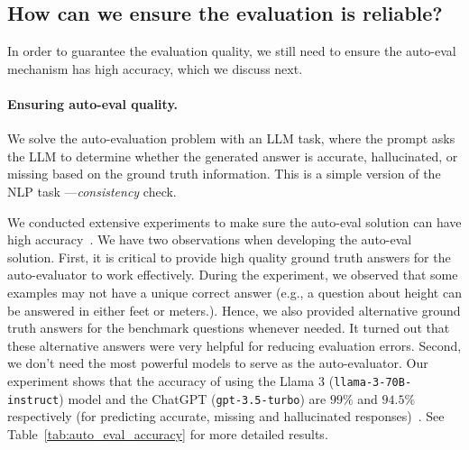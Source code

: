 \subsection{How can we ensure the evaluation is reliable?}
In order to guarantee the evaluation quality, we still need to ensure the auto-eval mechanism has high accuracy, which we discuss next.

\paragraph{Ensuring auto-eval quality.}
We solve the auto-evaluation problem with an LLM task, where the prompt asks the LLM to determine whether the generated answer is accurate, hallucinated, or missing based on the ground truth information. This is a simple version of the NLP task —{\em consistency} check.

We conducted extensive experiments to make sure the auto-eval solution can have high accuracy~\cite{yang2024crag}. We have two observations when developing the auto-eval solution. First, it is critical to provide high quality ground truth answers for the auto-evaluator to work effectively. During the experiment, we observed that some examples may not have a unique correct answer (e.g., a question about height can be answered in either feet or meters.). Hence, we also provided alternative ground truth answers for the benchmark questions whenever needed. It turned out that these alternative answers were very helpful for reducing evaluation errors. Second, we don't need the most powerful models to serve as the auto-evaluator. Our experiment shows that the accuracy of using the Llama 3 (\texttt{llama-3-70B-instruct}) model and the ChatGPT (\texttt{gpt-3.5-turbo}) are $99\%$ and $94.5\%$ respectively (for predicting accurate, missing and hallucinated responses)~\cite{yang2024crag}. See Table~\ref{tab:auto_eval_accuracy} for more detailed results.

